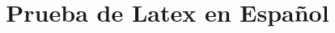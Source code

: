 \documentclass{report}
\begin{document}
\title{Prueba de Latex en Español}
\maketitle
\end{document}
